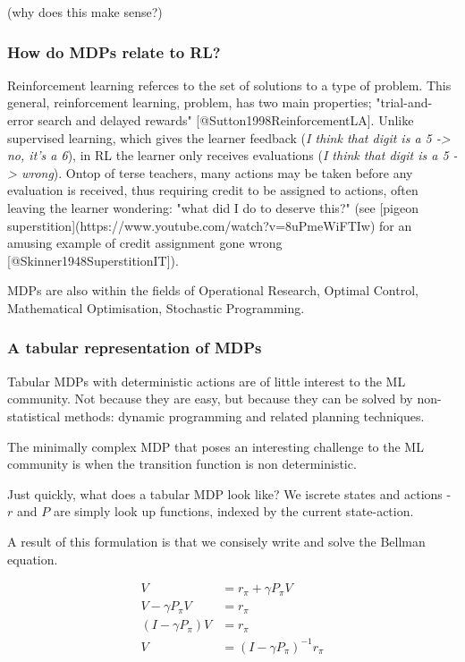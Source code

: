 (why does this make sense?)

\hypertarget{how-do-mdps-relate-to-rl}{%
\subsubsection{How do MDPs relate to RL?}\label{how-do-mdps-relate-to-rl}}

Reinforcement learning referces to the set of solutions to a type of problem.
This general, reinforcement learning, problem, has two main properties;
"trial-and-error search and delayed rewards" [@Sutton1998ReinforcementLA].
Unlike supervised learning, which gives the learner feedback (\textit{I think that digit
is a 5 -> no, it's a 6}), in RL the learner only receives evaluations (\textit{I think
that digit is a 5 -> wrong}). Ontop of terse teachers, many actions may be taken
before any evaluation is received, thus requiring credit to be assigned to actions,
often leaving the learner wondering: "what did I do to deserve this?" (see
[pigeon superstition](https://www.youtube.com/watch?v=8uPmeWiFTIw) for an amusing
example of credit assignment gone wrong [@Skinner1948SuperstitionIT]).

MDPs are also within the fields of Operational Research, Optimal Control, Mathematical
Optimisation, Stochastic Programming.

\hypertarget{a-tabular-representation-of-mdps}{%
\subsubsection{A tabular representation of MDPs}\label{a-tabular-representation-of-mdps}}

Tabular MDPs with deterministic actions are of little interest to the ML
community. Not because they are easy, but because they can be solved by non-statistical
methods: dynamic programming and related planning techniques.

The minimally complex MDP that poses an interesting challenge to the ML
community is when the transition function is non deterministic.

Just quickly, what does a tabular MDP look like? We iscrete states and
actions - \(r\) and \(P\) are simply look up functions, indexed by the
current state-action.

A result of this formulation is that we consisely write and solve the Bellman equation.

\begin{align}
V &= r_{\pi} + \gamma P_{\pi} V \tag{bellman eqn}\\
V - \gamma P_{\pi} V &= r_{\pi}\\
(I-\gamma P_{\pi})V &= r_{\pi}\\
V &= (I-\gamma P_{\pi})^{-1}r_{\pi}\\
\end{align}

